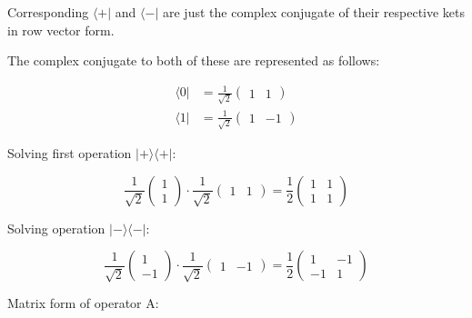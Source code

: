 \documentclass[10pt]{article}
\newcommand{\ket}[1]{\vert #1 \rangle}
\newcommand{\bra}[1]{\langle #1 \vert}
\begin{document}
\begin{enumerate}
\begin{enumerate}
        Corresponding $\bra{+}$ and $\bra{-}$ are just the complex conjugate of their respective kets in row vector form.
        
        The complex conjugate to both of these are represented as follows:

        \begin{align*}
          \bra{0} &= \frac{1}{\sqrt{2}} \begin{pmatrix} 1 & 1 \end{pmatrix} \\
          \bra{1} &= \frac{1}{\sqrt{2}} \begin{pmatrix} 1 & -1 \end{pmatrix} 
        \end{align*}

        Solving first operation $\ket{+}\bra{+}$:

        \begin{equation*}
          \frac{1}{\sqrt{2}} \begin{pmatrix} 1 \\ 1 \end{pmatrix} \cdot \frac{1}{\sqrt{2}} \begin{pmatrix} 1 & 1 \end{pmatrix} = \frac{1}{2} \begin{pmatrix} 1 & 1 \\ 1 & 1 \end{pmatrix}
        \end{equation*}

        Solving operation $\ket{-}\bra{-}$:

        \begin{equation*}
          \frac{1}{\sqrt{2}} \begin{pmatrix} 1 \\ -1 \end{pmatrix} \cdot \frac{1}{\sqrt{2}} \begin{pmatrix} 1 & -1 \end{pmatrix} = \frac{1}{2} \begin{pmatrix} 1 & -1 \\ -1 & 1 \end{pmatrix}
        \end{equation*}

        Matrix form of operator A:


\end{enumerate}
\end{enumerate}
\end{document}
